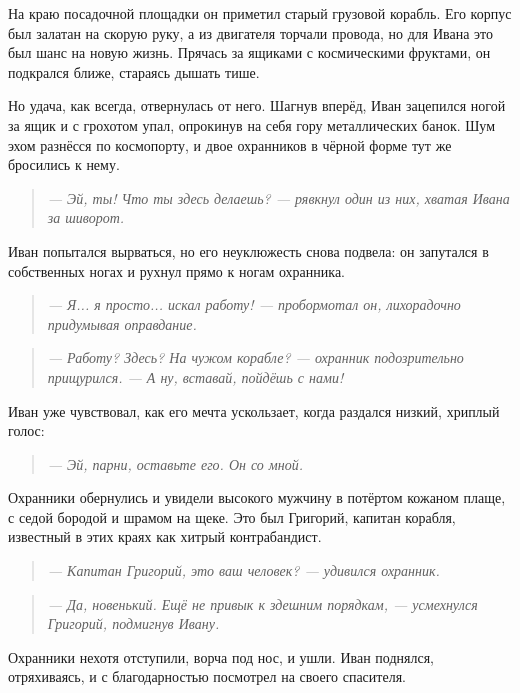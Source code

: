 \documentclass[12pt,a4paper]{book} %
\newenvironment{dialogue}{\begin{quote}\itshape}{\end{quote}}
\begin{document}
На краю посадочной площадки он приметил старый грузовой корабль. Его корпус был залатан на скорую руку, а из двигателя торчали провода, но для Ивана это был шанс на новую жизнь. Прячась за ящиками с космическими фруктами, он подкрался ближе, стараясь дышать тише.

Но удача, как всегда, отвернулась от него. Шагнув вперёд, Иван зацепился ногой за ящик и с грохотом упал, опрокинув на себя гору металлических банок. Шум эхом разнёсся по космопорту, и двое охранников в чёрной форме тут же бросились к нему.

\begin{dialogue}
--- Эй, ты! Что ты здесь делаешь? --- рявкнул один из них, хватая Ивана за шиворот.
\end{dialogue}

Иван попытался вырваться, но его неуклюжесть снова подвела: он запутался в собственных ногах и рухнул прямо к ногам охранника.

\begin{dialogue}
--- Я... я просто... искал работу! --- пробормотал он, лихорадочно придумывая оправдание.
\end{dialogue}

\begin{dialogue}
--- Работу? Здесь? На чужом корабле? --- охранник подозрительно прищурился. --- А ну, вставай, пойдёшь с нами!
\end{dialogue}

Иван уже чувствовал, как его мечта ускользает, когда раздался низкий, хриплый голос:

\begin{dialogue}
--- Эй, парни, оставьте его. Он со мной.
\end{dialogue}

Охранники обернулись и увидели высокого мужчину в потёртом кожаном плаще, с седой бородой и шрамом на щеке. Это был Григорий, капитан корабля, известный в этих краях как хитрый контрабандист.

\begin{dialogue}
--- Капитан Григорий, это ваш человек? --- удивился охранник.
\end{dialogue}

\begin{dialogue}
--- Да, новенький. Ещё не привык к здешним порядкам, --- усмехнулся Григорий, подмигнув Ивану.
\end{dialogue}

Охранники нехотя отступили, ворча под нос, и ушли. Иван поднялся, отряхиваясь, и с благодарностью посмотрел на своего спасителя.
\end{document}
